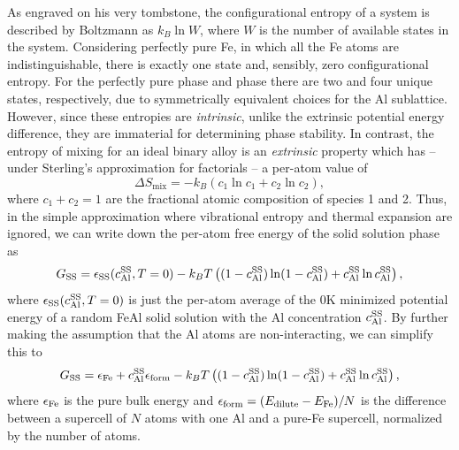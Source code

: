 As engraved on his very tombstone, the configurational entropy of a system is described by Boltzmann as $k_{B} \ln W$, where $W$ is the number of available states in the system.
Considering perfectly pure Fe, in which all the Fe atoms are indistinguishable, there is exactly one state and, sensibly, zero configurational entropy.
For the perfectly pure \BTWO phase and \DOTHREE phase there are two and four unique states, respectively, due to symmetrically equivalent choices for the Al sublattice.
However, since these entropies are \emph{intrinsic}, unlike the extrinsic potential energy difference, they are immaterial for determining phase stability.
In contrast, the entropy of mixing for an ideal binary alloy is an \emph{extrinsic} property which has -- under Sterling's approximation for factorials -- a per-atom value of
%
\begin{equation}
    \label{eq:mixing}
    \Delta S_{\mathrm{mix}} = -k_B \left(c_1 \ln c_1 + c_2 \ln c_2 \right),
\end{equation}
%
where $c_1 + c_2 = 1$ are the fractional atomic composition of species 1 and 2.
Thus, in the simple approximation where vibrational entropy and thermal expansion are ignored, we can write down the per-atom free energy of the solid solution phase as
%
\begin{equation}
    \label{eq:ss_simple}
    G_{\mathrm{SS}} = \epsilon_{\mathrm{SS}}(c_{\mathrm{Al}}^{\mathrm{SS}}, T=0) -k_B T \left( (1-c_{\mathrm{Al}}^{\mathrm{SS}})\ln(1 - c_{\mathrm{Al}}^{\mathrm{SS}}) + c_{\mathrm{Al}}^{\mathrm{SS}}\ln c_{\mathrm{Al}}^{\mathrm{SS}} \right),
\end{equation}
%
where $\epsilon_{\mathrm{SS}}(c_{\mathrm{Al}}^{\mathrm{SS}}, T=0)$ is just the per-atom average of the 0K minimized potential energy of a random FeAl solid solution with the Al concentration $c_{\mathrm{Al}}^{\mathrm{SS}}$.
By further making the assumption that the Al atoms are non-interacting, we can simplify this to
\begin{equation}
    \label{eq:ss_super_simple}
    G_{\mathrm{SS}} = \epsilon_{\mathrm{Fe}} + c_{\mathrm{Al}}^{\mathrm{SS}} \epsilon_{\mathrm{form}} -k_B T \left( (1-c_{\mathrm{Al}}^{\mathrm{SS}})\ln(1 - c_{\mathrm{Al}}^{\mathrm{SS}}) + c_{\mathrm{Al}}^{\mathrm{SS}}\ln c_{\mathrm{Al}}^{\mathrm{SS}} \right),
\end{equation}
%
where $\epsilon_{\mathrm{Fe}}$ is the pure bulk energy and $\epsilon_{\mathrm{form}} = (E_{\mathrm{dilute}} - E_{\mathrm{Fe}}) / N$ is the difference between a supercell of $N$ atoms with one Al and a pure-Fe supercell, normalized by the number of atoms.

